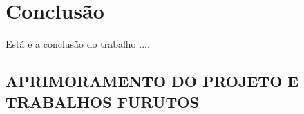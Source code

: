 \chapter{Conclusão}

Está é a conclusão do trabalho ....

\section{APRIMORAMENTO DO PROJETO E TRABALHOS FURUTOS}